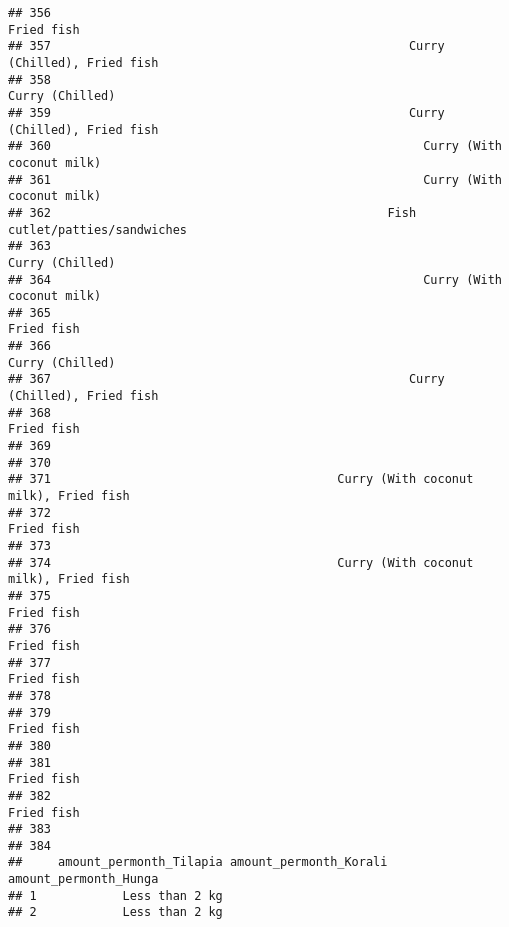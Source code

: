 \documentclass[
]{article}
\begin{document}
\begin{verbatim}
## 356                                                                   Fried fish
## 357                                                  Curry (Chilled), Fried fish
## 358                                                              Curry (Chilled)
## 359                                                  Curry (Chilled), Fried fish
## 360                                                    Curry (With coconut milk)
## 361                                                    Curry (With coconut milk)
## 362                                               Fish cutlet/patties/sandwiches
## 363                                                              Curry (Chilled)
## 364                                                    Curry (With coconut milk)
## 365                                                                   Fried fish
## 366                                                              Curry (Chilled)
## 367                                                  Curry (Chilled), Fried fish
## 368                                                                   Fried fish
## 369                                                                             
## 370                                                                             
## 371                                        Curry (With coconut milk), Fried fish
## 372                                                                   Fried fish
## 373                                                                             
## 374                                        Curry (With coconut milk), Fried fish
## 375                                                                   Fried fish
## 376                                                                   Fried fish
## 377                                                                   Fried fish
## 378                                                                             
## 379                                                                   Fried fish
## 380                                                                             
## 381                                                                   Fried fish
## 382                                                                   Fried fish
## 383                                                                             
## 384                                                                             
##     amount_permonth_Tilapia amount_permonth_Korali amount_permonth_Hunga
## 1            Less than 2 kg                                             
## 2            Less than 2 kg                                             

\end{verbatim}
\end{document}

